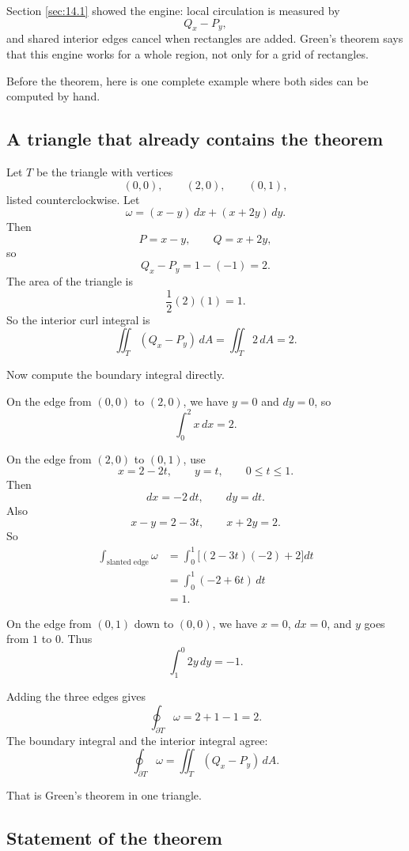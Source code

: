Section \ref{sec:14.1} showed the engine: local circulation is measured by
\[
    Q_x-P_y,
\]
and shared interior edges cancel when rectangles are added.  Green's theorem says that
this engine works for a whole region, not only for a grid of rectangles.

Before the theorem, here is one complete example where both sides can be computed by
hand.

\subsection{A triangle that already contains the theorem}

Let \(T\) be the triangle with vertices
\[
    (0,0),\qquad (2,0),\qquad (0,1),
\]
listed counterclockwise.  Let
\[
    \omega=(x-y)\,dx+(x+2y)\,dy.
\]
Then
\[
    P=x-y,
    \qquad
    Q=x+2y,
\]
so
\[
    Q_x-P_y=1-(-1)=2.
\]
The area of the triangle is
\[
    \frac12(2)(1)=1.
\]
So the interior curl integral is
\[
\boxed{
    \iint_T (Q_x-P_y)\,dA
    =
    \iint_T 2\,dA
    =2.
}
\]

Now compute the boundary integral directly.

On the edge from \((0,0)\) to \((2,0)\), we have \(y=0\) and \(dy=0\), so
\[
    \int_0^2 x\,dx=2.
\]

On the edge from \((2,0)\) to \((0,1)\), use
\[
    x=2-2t,
    \qquad
    y=t,
    \qquad
    0\le t\le1.
\]
Then
\[
    dx=-2\,dt,
    \qquad
    dy=dt.
\]
Also
\[
    x-y=2-3t,
    \qquad
    x+2y=2.
\]
So
\[
\begin{aligned}
\int_{\text{slanted edge}}\omega
&=
\int_0^1\bigl[(2-3t)(-2)+2\bigr]dt\\
&=
\int_0^1(-2+6t)\,dt\\
&=1.
\end{aligned}
\]

On the edge from \((0,1)\) down to \((0,0)\), we have \(x=0\), \(dx=0\), and \(y\)
goes from \(1\) to \(0\).  Thus
\[
    \int_1^0 2y\,dy=-1.
\]

Adding the three edges gives
\[
\boxed{
    \oint_{\partial T}\omega
    =2+1-1=2.
}
\]
The boundary integral and the interior integral agree:
\[
\boxed{
    \oint_{\partial T}\omega
    =
    \iint_T (Q_x-P_y)\,dA.
}
\]

That is Green's theorem in one triangle.

\subsection{Statement of the theorem}

